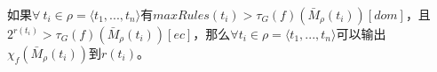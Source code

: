 \begin{lemma} 
\label{lemma:core-lemma}
如果$\forall\ t_i \in \rho = \langle t_1, ..., t_n \rangle$有$maxRules(t_i) > \tau_G(f)(\bar{M}_\rho(t_i))[dom]$，且$2^{r(t_i)} > \tau_G(f)(\bar{M}_\rho(t_i))[ec]$，那么$\forall t_i \in \rho = \langle t_1, ..., t_n \rangle$可以输出$\chi_f(\bar{M}_\rho(t_i))$到$r(t_i)$。
\end{lemma}
%
%
%
%
%
%
%
%
%
